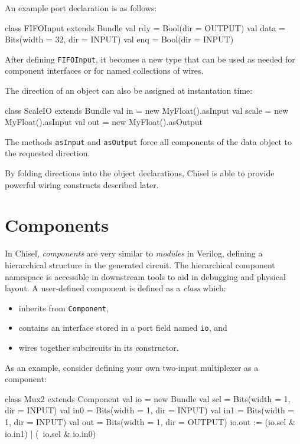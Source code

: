 \documentclass[twocolumn,10pt]{article}
\def\code#1{{\tt #1}}
\begin{document}
An example port declaration is as follows:
\begin{scala}
class FIFOInput extends Bundle {
  val rdy  = Bool(dir = OUTPUT)
  val data = Bits(width = 32, dir = INPUT)
  val enq  = Bool(dir = INPUT)
}
\end{scala}

\noindent
After defining \code{FIFOInput}, it becomes a new type that can be
used as needed for component interfaces or for named collections of
wires.

The direction of an object can also be assigned at instantation time:
\begin{scala}
class ScaleIO extends Bundle {
  val in    = new MyFloat().asInput
  val scale = new MyFloat().asInput
  val out   = new MyFloat().asOutput
}
\end{scala}

\noindent
The methods \code{asInput} and \code{asOutput} force all components of
the data object to the requested direction.

By folding directions into the object declarations, Chisel is able to
provide powerful wiring constructs described later.



\section{Components}

In Chisel, {\em components} are very similar to {\em modules} in
Verilog, defining a hierarchical structure in the generated circuit.
The hierarchical component namespace is accessible in downstream tools
to aid in debugging and physical layout.  A user-defined component is
defined as a {\em class} which:
\begin{itemize}
\item inherits from \code{Component},
\item contains an interface stored in a port field named \code{io}, and
\item wires together subcircuits in its constructor.
\end{itemize}
As an example, consider defining your own two-input multiplexer as a
component:
\begin{scala}
class Mux2 extends Component {
  val io = new Bundle{
    val sel = Bits(width = 1, dir = INPUT)
    val in0 = Bits(width = 1, dir = INPUT)
    val in1 = Bits(width = 1, dir = INPUT)
    val out = Bits(width = 1, dir = OUTPUT)
  }
  io.out := (io.sel & io.in1) | (~io.sel & io.in0)
}
\end{scala}
\end{document}
